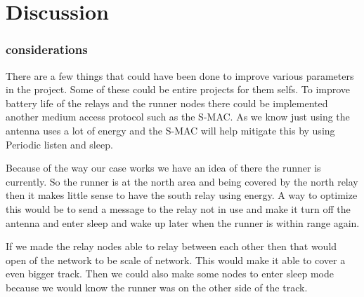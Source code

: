 \chapter{Discussion}
\subsection{considerations}
There are a few things that could have been done to improve various parameters in the project. Some of these could be entire projects for them selfs.
To improve battery life of the relays and the runner nodes there could be implemented another medium access protocol such as the S-MAC. As we know just using the antenna uses a lot of energy and the S-MAC will help mitigate this by using Periodic listen and sleep.

Because of the way our case works we have an idea of there the runner is currently. So the runner is at the north area and being covered by the north relay then it makes little sense to have the south relay using energy. A way to optimize this would be to send a message to the relay not in use and make it turn off the antenna and enter sleep and wake up later when the runner is within range again.   

If we made the relay nodes able to relay between each other then that would open of the network to be scale of network. This would make it able to cover a even bigger track. Then we could also make some nodes to enter sleep mode because we would know the runner was on the other side of the track.